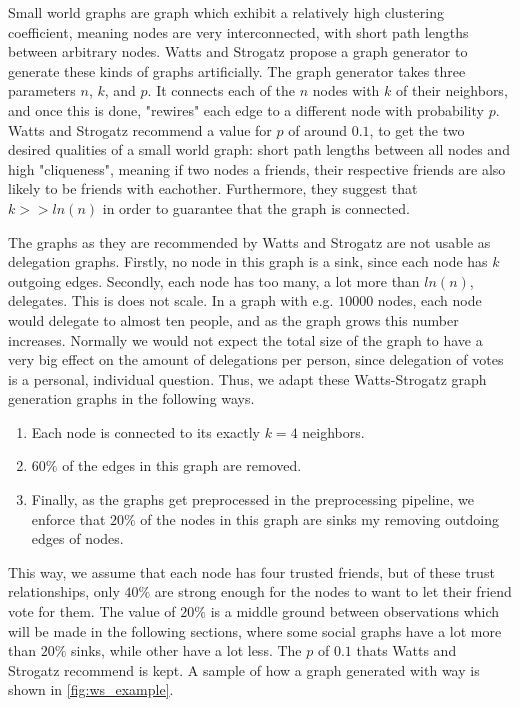 Small world graphs are graph which exhibit a relatively high clustering coefficient, meaning nodes are very interconnected, with short path lengths between arbitrary nodes. Watts and Strogatz propose a graph generator to generate these kinds of graphs artificially. The graph generator takes three parameters $n$, $k$, and $p$. It connects each of the $n$ nodes with $k$ of their neighbors, and once this is done, "rewires" each edge to a different node with probability $p$. Watts and Strogatz recommend a value for $p$ of around $0.1$, to get the two desired qualities of a small world graph: short path lengths between all nodes and high "cliqueness", meaning if two nodes a friends, their respective friends are also likely to be friends with eachother. Furthermore, they suggest that $k >> ln(n)$ in order to guarantee that the graph is connected. 

The graphs as they are recommended by Watts and Strogatz are not usable as delegation graphs. Firstly, no node in this graph is a sink, since each node has $k$ outgoing edges. Secondly, each node has too many, a lot more than $ln(n)$, delegates. This is does not scale. In a graph with e.g. $10 000$ nodes, each node would delegate to almost ten people, and as the graph grows this number increases. Normally we would not expect the total size of the graph to have a very big effect on the amount of delegations per person, since delegation of votes is a personal, individual question. Thus, we adapt these Watts-Strogatz graph generation graphs in the following ways.

\begin{enumerate}
\item Each node is connected to its exactly $k=4$ neighbors. 
\item $60\%$ of the edges in this graph are removed. 
\item Finally, as the graphs get preprocessed in the preprocessing pipeline, we enforce that $20\%$ of the nodes in this graph are sinks my removing outdoing edges of nodes.  
\end{enumerate}

This way, we assume that each node has four trusted friends, but of these trust relationships, only $40\%$ are strong enough for the nodes to want to let their friend vote for them. The value of $20\%$ is a middle ground between observations which will be made in the following sections, where some social graphs have a lot more than $20\%$ sinks, while other have a lot less. The $p$ of $0.1$ thats Watts and Strogatz recommend is kept. A sample of how a graph generated with way is shown in \cref{fig:ws_example}. 

